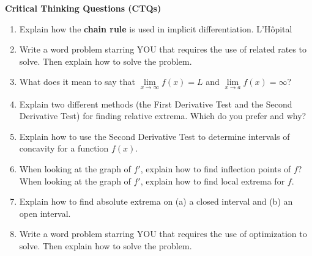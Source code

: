 \documentclass[12pt]{article}
\begin{document}
\textbf{Critical Thinking Questions (CTQs)}

\begin{enumerate}
    \setlength\itemsep{1em}
    \item Explain how the \textbf{chain rule} is used in implicit differentiation.  L'H\^{o}pital
    \item Write a word problem starring YOU that requires the use of related rates to solve. Then explain how to solve the problem. 
    \item What does it mean to say that $\lim\limits_{x \to \infty}f(x)=L$ and $\lim\limits_{x \to a}f(x)=\infty$?
    \item Explain two different methods (the First Derivative Test and the Second Derivative Test) for finding relative extrema. Which do you prefer and why?
    \item Explain how to use the Second Derivative Test to determine intervals of concavity for a function $f(x)$.
    \item When looking at the graph of $f'$, explain how to find inflection points of $f$? When looking at the graph of $f'$, explain how to find local extrema for $f$.
    \item Explain how to find absolute extrema on (a) a closed interval and (b) an open interval.
    \item Write a word problem starring YOU that requires the use of optimization to solve. Then explain how to solve the problem.
\end{enumerate}
\end{document}
